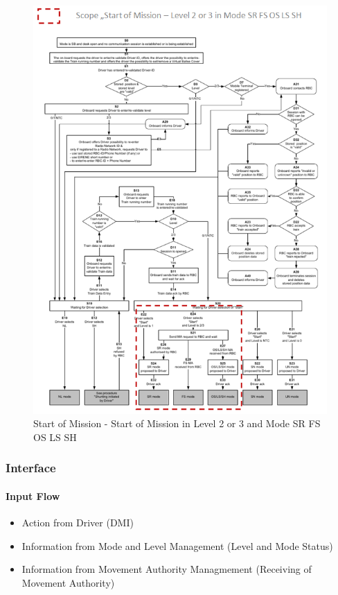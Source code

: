 \begin{figure}
\centering
\includegraphics[scale=0.7]{images/SoMLevel2_3_SR_FS_OS_LS_SH}
\caption{Start of Mission - Start of Mission in Level 2 or 3 and Mode SR FS OS LS SH}
\label{Start of Mission - Start of Mission in Level 2 or 3 and Mode SR FS OS LS SH}
\end{figure}


\subsubsection{Interface}
\paragraph{Input Flow}
\begin{itemize}
\item Action from Driver (DMI)
\item Information from Mode and Level Management (Level and Mode Status)
\item Information from Movement Authority Managmement (Receiving of Movement Authority)
\end{itemize}

